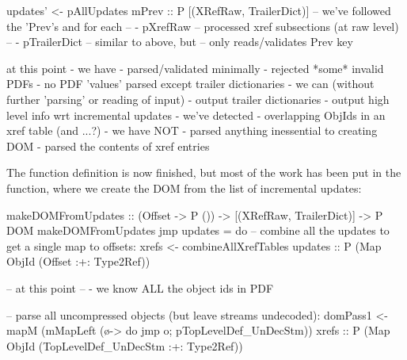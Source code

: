 \begin{code}
    updates' <- pAllUpdates mPrev :: P [(XRefRaw, TrailerDict)]
       -- we've followed the 'Prev's and for each
       --   - pXrefRaw     -- processed xref subsections (at raw level)
       --   - pTrailerDict -- similar to above, but
       --                     only reads/validates Prev key
\end{code}

at this point
 - we have
   - parsed/validated minimally
   - rejected *some* invalid PDFs
   - no PDF 'values' parsed except trailer dictionaries
 - we can (without further 'parsing' or reading of input)
   - output trailer dictionaries
   - output high level info wrt incremental updates
 - we've detected
   - overlapping ObjIds in an xref table (and ...?)
 - we have NOT
   - parsed anything inessential to creating DOM
   - parsed the contents of xref entries


The  function definition is now finished, but most of
the work has been put in the  function,
where we create the DOM from the list of incremental updates:

\begin{code}
makeDOMFromUpdates :: (Offset -> P ()) -> [(XRefRaw, TrailerDict)] -> P DOM
makeDOMFromUpdates jmp updates =
    do
    -- combine all the updates to get a single map to offsets:
    xrefs <- combineAllXrefTables updates
             :: P (Map ObjId (Offset :+: Type2Ref))

    -- at this point
    --  - we know ALL the object ids in PDF

    -- parse all uncompressed objects (but leave streams undecoded):
    domPass1 <- mapM
                  (mMapLeft (\o-> do {jmp o; pTopLevelDef_UnDecStm}))
                  xrefs
                :: P (Map ObjId (TopLevelDef_UnDecStm :+: Type2Ref))
\end{code}

